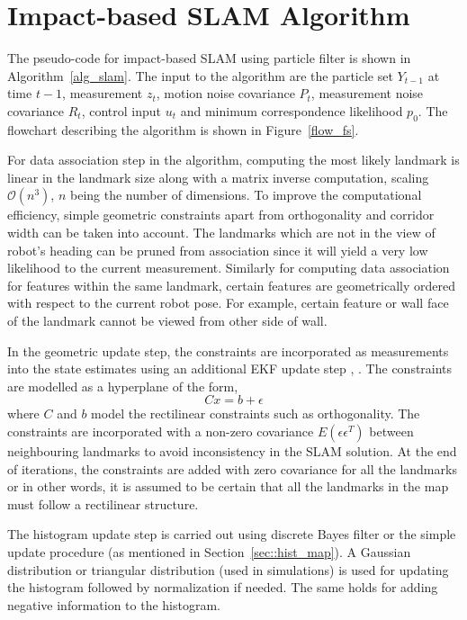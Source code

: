 \chapter{Impact-based SLAM Algorithm}	\label{chap::pseudocode}
The pseudo-code for impact-based SLAM using particle filter is shown in Algorithm~\ref{alg_slam}. The input to the algorithm are the particle set $Y_{t-1}$ at time $t-1$, measurement $z_t$, motion noise covariance $P_t$, measurement noise covariance $R_t$, control input $u_t$ and minimum correspondence likelihood $p_0$. The flowchart describing the algorithm is shown in Figure~\ref{flow_fs}.

For data association step in the algorithm, computing the most likely landmark is linear in the landmark size along with a matrix inverse computation, scaling $\mathcal{O}(n^3)$, $n$ being the number of dimensions. To improve the computational efficiency, simple geometric constraints apart from orthogonality and corridor width can be taken into account. The landmarks which are not in the view of robot's heading can be pruned from association since it will yield a very low likelihood to the current measurement. Similarly for computing data association for features within the same landmark, certain features are geometrically ordered with respect to the current robot pose. For example, certain feature or wall face of the landmark cannot be viewed from other side of wall. 

In the geometric update step, the constraints are incorporated as measurements into the state estimates using an additional EKF update step \cite{rodriguez2007consistency}, \cite{newman1999structure}. The constraints are modelled as a hyperplane of the form,
\begin{equation}
Cx = b + \epsilon
\end{equation}
where $C$ and $b$ model the rectilinear constraints such as orthogonality. The constraints are incorporated with a non-zero covariance $E(\epsilon\epsilon^T)$ between neighbouring landmarks to avoid inconsistency in the SLAM solution. At the end of iterations, the constraints are added with zero covariance for all the landmarks or in other words, it is assumed to be certain that all the landmarks in the map must follow a rectilinear structure.

The histogram update step is carried out using discrete Bayes filter or the simple update procedure (as mentioned in Section~\ref{sec::hist_map}). A Gaussian distribution or triangular distribution (used in simulations) is used for updating the histogram followed by normalization if needed. The same holds for adding negative information to the histogram.  

